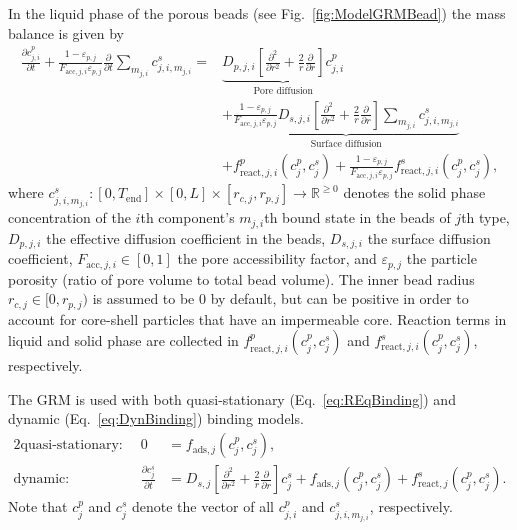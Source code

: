 In the liquid phase of the porous beads (see Fig.~\ref{fig:ModelGRMBead}) the mass balance is given by
\begin{equation} \begin{split}
	\frac{\partial c^p_{j,i}}{\partial t} + \frac{1 - \varepsilon_{p,j}}{F_{\text{acc},j,i} \varepsilon_{p,j}} \frac{\partial}{\partial t} \sum_{m_{j,i}} c^s_{j,i,m_{j,i}} = &\underbrace{D_{p,j,i} \left[\frac{\partial^2}{\partial r^2} + \frac{2}{r} \frac{\partial}{\partial r} \right]c^p_{j,i}}_{\text{Pore diffusion}} \\
	&+ \underbrace{\frac{1 - \varepsilon_{p,j}}{F_{\text{acc},j,i} \varepsilon_{p,j}} D_{s,j,i} \left[\frac{\partial^2}{\partial r^2} + \frac{2}{r} \frac{\partial }{\partial r} \right] \sum_{m_{j,i}} c^s_{j,i,m_{j,i}} }_{\text{Surface diffusion}} \\
	&+ f_{\text{react},j,i}^p\left( c_j^p, c_j^s \right) + \frac{1 - \varepsilon_{p,j}}{F_{\text{acc},j,i} \varepsilon_{p,j}} f_{\text{react},j,i}^s\left( c_j^p, c_j^s \right), \label{eq:ModelBead}
\end{split}\end{equation}
where $c^s_{j,i,m_{j,i}}\colon \left[0, T_{\text{end}}\right] \times [0,L] \times [r_{c,j}, r_{p,j}] \rightarrow \mathds{R}^{\geq 0}$ denotes the solid phase concentration of the $i$th component's $m_{j,i}$th bound state in the beads of $j$th type, $D_{p,j,i}$ the effective diffusion coefficient in the beads, $D_{s,j,i}$ the surface diffusion coefficient, $F_{\text{acc},j,i} \in [0,1]$ the pore accessibility factor, and $\varepsilon_{p,j}$ the particle porosity (ratio of pore volume to total bead volume).
The inner bead radius $r_{c,j} \in [0, r_{p,j})$ is assumed to be $0$ by default, but can be positive in order to account for core-shell particles that have an impermeable core.
Reaction terms in liquid and solid phase are collected in $f_{\text{react},j,i}^p( c_j^p, c_j^s)$ and $f_{\text{react},j,i}^s(c_j^p, c_j^s)$, respectively.

The GRM is used with both quasi-stationary (Eq.~\eqref{eq:REqBinding}) and dynamic (Eq.~\eqref{eq:DynBinding}) binding models. 
\begin{alignat}{2}
	\text{quasi-stationary: }& & 0 &= f_{\text{ads},j}\left( c^p_j, c^s_j\right), \label{eq:REqBinding} \\
	\text{dynamic: }& & \frac{\partial c^s_j}{\partial t} &= D_{s,j} \left[\frac{\partial^2}{\partial r^2} + \frac{2}{r} \frac{\partial }{\partial r} \right] c^s_{j} + f_{\text{ads},j}\left( c^p_j, c^s_j\right) + f_{\text{react},j}^s\left( c_j^p, c_j^s \right). \label{eq:DynBinding}
\end{alignat}
Note that $c^p_j$ and $c^s_j$ denote the vector of all $c^p_{j,i}$ and $c^s_{j,i,m_{j,i}}$, respectively.

